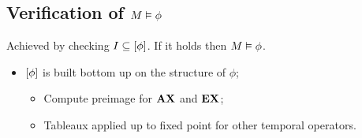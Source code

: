\subsection{Verification of $M \vDash \phi$}

Achieved by checking $I \subseteq \left[{\phi}\right]$. If it holds then $M
\vDash \phi$.
\begin{itemize}

\item   $\left[{\phi}\right]$ is built bottom up on the structure of $\phi$;

    \begin{itemize}

    \item   Compute preimage for $\AX$ and $\EX$;

    \item   Tableaux applied up to fixed point for other temporal
            operators.

    \end{itemize}

\end{itemize}

